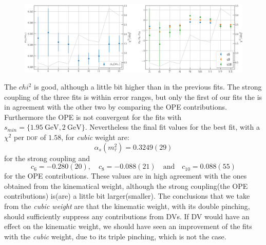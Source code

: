 \documentclass[../../index.tex]{subfiles}
\begin{document}
\begin{figure}
  \centering
  \includegraphics[width=\textwidth]{./images/fitWCubeAlD6D8D10.png}
  \label{fig:fitWCubeAlpha}
\end{figure}
The $chi^2$ is good, although a little bit higher than in the previous fits. The
strong coupling of the three fits is within error ranges, but only the first of
our fits the is in agreement with the other two by comparing the \textsc{OPE}
contributions. Furthermore the OPE is not convergent for the fits with
$s_{min}=\{\SI{1.95}{\giga\eV},\SI{2}{\giga\eV}\}$. Nevertheless the final fit
values for the best fit, with a $\chi^2$ per \textsc{dof} of $1.58$, for \textit{cubic} weight are:
\begin{equation}
  \alpha_s(m_\tau^2) = 0.3249(29)
\end{equation}
for the strong coupling and
\begin{equation}
  c_6 = -0.280(20), \quad c_8 = -0.088(21) \quad \text{and} \quad c_{10} = 0.088(55)
\end{equation}
for the \textsc{OPE} contributions. These values are in high agreement with the
ones obtained from the kinematical weight, although the strong coupling(the
\textsc{OPE} contributions) is(are) a little bit larger(smaller). The
conclusions that we take from the \textit{cubic weight} are that the kinematic
weight, with its double pinching, should sufficiently suppress any contributions
from \textsc{DV}s. If \textsc{DV} would have an effect on the kinematic weight,
we should have seen an improvement of the fits with the \textit{cubic} weight,
due to its triple pinching, which is not the case.
\end{document}
